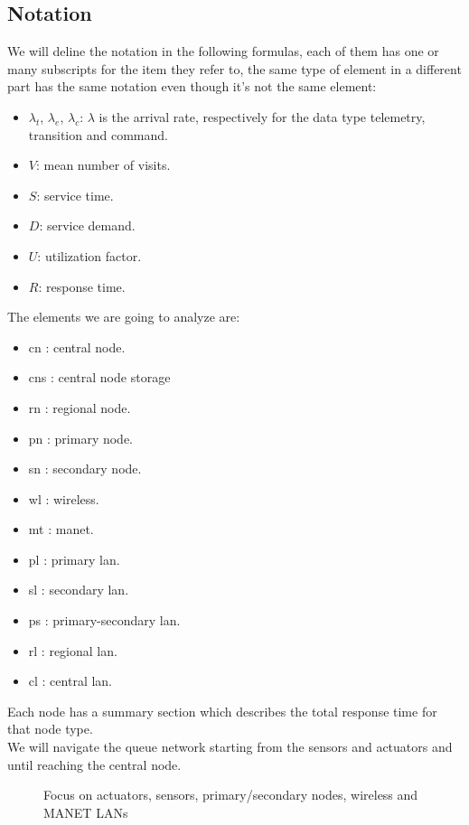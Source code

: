 \documentclass[11pt]{article}
\begin{document}
\subsection{Notation}
We will deline the notation in the following formulas, each of them has one or many subscripts for the item they refer to, the same type of element in a different part has the same notation even though it's not the same element:
\begin{itemize}
\item $\lambda_t$, $\lambda_e$, $\lambda_c$: $\lambda$ is the arrival rate, respectively for the data type telemetry, transition and command.
\item $V$: mean number of visits.
\item $S$: service time.
\item $D$: service demand.
\item $U$: utilization factor.
\item $R$: response time.
\end{itemize}
The elements we are going to analyze are:
\begin{itemize}
\item cn : central node.
\item cns : central node storage
\item rn : regional node.
\item pn : primary node.
\item sn : secondary node.
\item wl : wireless.
\item mt : manet.
\item pl : primary lan.
\item sl : secondary lan.
\item ps : primary-secondary lan.
\item rl : regional lan.
\item cl : central lan.
\end{itemize}
Each node has a summary section which describes the total response time for that node type.\\
We will navigate the queue network starting from the sensors and actuators and until reaching the central node.

\begin{figure}[H]
	\centering
	\frame{}
	\caption{Focus on actuators, sensors,  primary/secondary nodes, wireless and MANET LANs}
\end{figure}
\end{document}

